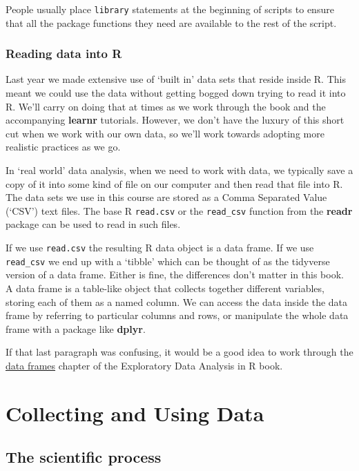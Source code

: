 \documentclass[
]{book}
\begin{document}
People usually place \texttt{library} statements at the beginning of scripts to ensure that all the package functions they need are available to the rest of the script.

\hypertarget{reading-data-into-r}{%
\section{Reading data into R}\label{reading-data-into-r}}

Last year we made extensive use of `built in' data sets that reside inside R. This meant we could use the data without getting bogged down trying to read it into R. We'll carry on doing that at times as we work through the book and the accompanying \textbf{learnr} tutorials. However, we don't have the luxury of this short cut when we work with our own data, so we'll work towards adopting more realistic practices as we go.

In `real world' data analysis, when we need to work with data, we typically save a copy of it into some kind of file on our computer and then read that file into R. The data sets we use in this course are stored as a Comma Separated Value (`CSV') text files. The base R \texttt{read.csv} or the \texttt{read\_csv} function from the \textbf{readr} package can be used to read in such files.

If we use \texttt{read.csv} the resulting R data object is a data frame. If we use \texttt{read\_csv} we end up with a `tibble' which can be thought of as the tidyverse version of a data frame. Either is fine, the differences don't matter in this book. A data frame is a table-like object that collects together different variables, storing each of them as a named column. We can access the data inside the data frame by referring to particular columns and rows, or manipulate the whole data frame with a package like \textbf{dplyr}.

If that last paragraph was confusing, it would be a good idea to work through the \href{https://dzchilds.github.io/eda-for-bio/data-frames.html}{data frames} chapter of the Exploratory Data Analysis in R book.

\hypertarget{part-collecting-and-using-data}{%
\part{Collecting and Using Data}\label{part-collecting-and-using-data}}

\hypertarget{scientific-process}{%
\chapter{The scientific process}\label{scientific-process}}
\end{document}
